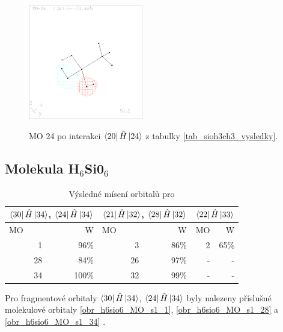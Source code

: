 \documentclass[
  digital, %
  table,   %
  lof,     %
  lot,     %
]{fithesis3}
\begin{document}
\begin{figure}[h]
\caption{MO 24 po interakci $\bra{20}{\hat{H}}\ket{24}$ z tabulky \ref{tab_sioh3ch3_vysledky}.  }
  \center
  \includegraphics[width=5cm]{sioh3ch3_obrazky/s4_24.eps}
  \label{obr_sioh3ch3_MO_s4_24}
  \end{figure}
  \subsection{Molekula H$_6$Si0$_6$}
 
  \begin{table}[htbp]
\caption{Výsledné mísení orbitalů pro }
\begin{center}
\begin{tabular}{|r|r|r|r|r|r|}
\hline
\multicolumn{2}{|c}{$\bra{30}{\hat{H}}\ket{34}$, $\bra{24}{\hat{H}}\ket{34}$} & \multicolumn{2}{|c|}{$\bra{21}{\hat{H}}\ket{32}$, $\bra{28}{\hat{H}}\ket{32}$}& \multicolumn{2}{|c|}{$\bra{22}{\hat{H}}\ket{33}$} \\
\hline \hline
\multicolumn{1}{|l|}{MO} & \multicolumn{1}{r|}{W} & \multicolumn{1}{l|}{MO} & \multicolumn{1}{r|}{W} & MO & \multicolumn{1}{r|}{W} \\ \hline
1 & 96\% & 3 & 86\% &2 & 65\% \\ \hline
28 & 84\% & 26 & 97\% & - & - \\ \hline
34 & 100\% & 32 & 99\% &  -& - \\ \hline
\end{tabular}
\end{center}
\label{tab_h6sio6_vysledky}
\end{table}

Pro fragmentové orbitaly $\bra{30}{\hat{H}}\ket{34}$, $\bra{24}{\hat{H}}\ket{34}$ byly nalezeny příslušné molekulové orbitaly \ref{obr_h6sio6_MO_s1_1}, \ref{obr_h6sio6_MO_s1_28} a \ref{obr_h6sio6_MO_s1_34} .
  
\end{document}
